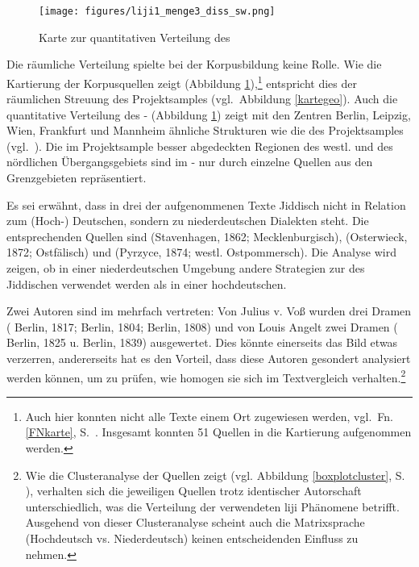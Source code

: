  
\begin{figure}[p]
\texttt{[image: figures/liji1\_menge3\_diss\_sw.png]}
		\caption{\label{karteliji1menge} Karte zur quantitativen Verteilung des  }
		\end{figure}

 
Die räumliche Verteilung spielte bei der Korpusbildung keine Rolle. Wie die Kartierung der Korpusquellen zeigt (Abbildung \ref{karteliji1menge}),\footnote{Auch hier konnten nicht alle Texte einem Ort zugewiesen werden, vgl.\, Fn. \ref{FNkarte}, S.\, \pageref{FNkarte}. Insgesamt konnten 51 Quellen in die Kartierung aufgenommen werden.} entspricht dies der räumlichen Streuung des Projektsamples (vgl.\, Abbildung \ref{kartegeo}). Auch die quantitative Verteilung des - (Abbildung \ref{karteliji1menge}) zeigt mit den Zentren Berlin, Leipzig, Wien, Frankfurt und Mannheim ähnliche Strukturen wie die des Projektsamples (vgl.\, \citealt[64, Abbildung 4.16]{SchaeferDiss}). Die im Projektsample besser abgedeckten Regionen des westl. \hai{{\NWJ}} und des nördlichen Übergangsgebiets sind im - nur durch einzelne Quellen aus den Grenzgebieten repräsentiert. 





  
  Es sei erwähnt, dass in drei der aufgenommenen Texte Jiddisch nicht in Relation zum (Hoch-) Deutschen, sondern zu niederdeutschen Dialekten steht. Die entsprechenden Quellen sind  (Stavenhagen, 1862; Mecklenburgisch),  (Osterwieck, 1872; Ostfälisch) und  (Pyrzyce, 1874; westl. Ostpommersch). Die Analyse wird zeigen, ob in einer niederdeutschen Umgebung andere Strategien zur  des Jiddischen verwendet werden als in einer hochdeutschen.
  
Zwei Autoren sind im  mehrfach vertreten: Von Julius v. Voß wurden drei Dramen ( Berlin, 1817;  Berlin, 1804;  Berlin, 1808) und von Louis Angelt zwei Dramen ( Berlin, 1825 u.  Berlin, 1839) ausgewertet. Dies könnte einerseits das Bild etwas verzerren, andererseits hat es den Vorteil, dass diese Autoren gesondert analysiert werden können, um zu prüfen, wie homogen sie sich im Textvergleich verhalten.\footnote{Wie die Clusteranalyse der Quellen zeigt (vgl. Abbildung \ref{boxplotcluster}, S. \pageref{boxplotcluster}), verhalten sich die jeweiligen Quellen trotz identischer Autorschaft unterschiedlich, was die Verteilung der verwendeten liji Phänomene betrifft. Ausgehend von dieser Clusteranalyse scheint auch die Matrixsprache (Hochdeutsch vs. Niederdeutsch) keinen entscheidenden Einfluss zu nehmen.}


